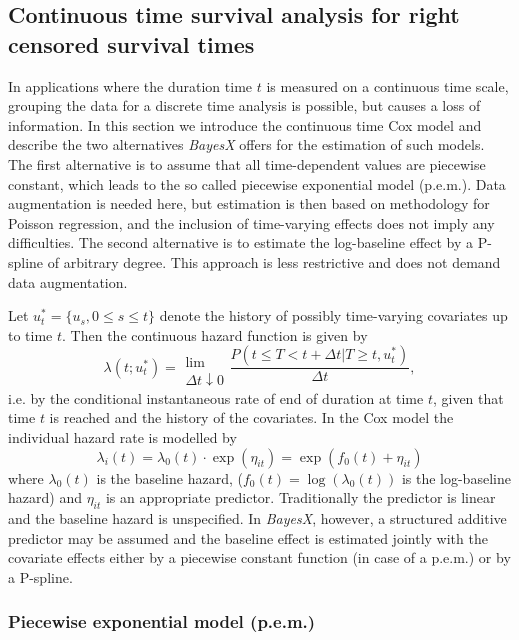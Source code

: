 \documentclass[11pt,a4paper,twoside]{bayesxarticle}
\begin{document}
\subsection{Continuous time survival analysis for right censored survival times}
\label{continuoustime}

In applications where the duration time $t$ is measured on a
continuous time scale, grouping the data for a discrete time
analysis is possible, but causes a loss of information. In this
section we introduce the continuous time Cox model and describe the
two alternatives \textit{BayesX} offers for the estimation of such
models. The first alternative is to assume that all time-dependent
values are piecewise constant, which leads to the so called
piecewise exponential model (p.e.m.). Data augmentation is needed
here, but estimation is then based on methodology for Poisson
regression, and the inclusion of time-varying effects does not imply
any difficulties. The second alternative is to estimate the
log-baseline effect by a P-spline of arbitrary degree. This approach
is less restrictive and does not demand data augmentation.

Let $u_t^{*}=\{u_s,0 \le s \le t\}$ denote the history of possibly
time-varying covariates up to time $t$. Then the continuous hazard
function is given by
\[
\lambda(t;u_t^{*})=\begin{array}{c}\\\mbox{lim}\\{\Delta t
\downarrow 0}\end{array}\frac{P(t \le T< t+\Delta t | T\ge t,
u_t^{*})}{\Delta t},
\]
i.e. by the conditional instantaneous rate of end of duration at
time $t$, given that time $t$ is reached and the history of the
covariates. In the Cox model the individual hazard rate is modelled
by
\begin{equation}\label{CoxModel}
\lambda_i(t)=\lambda_0(t)\cdot
\exp(\eta_{it})=\exp(f_0(t)+\eta_{it})
\end{equation}
where $\lambda_0(t)$ is the baseline hazard,
($f_0(t)=\log(\lambda_0(t))$ is the log-baseline hazard) and
$\eta_{it}$ is an appropriate predictor. Traditionally the predictor
is linear and the baseline hazard is unspecified. In
\textit{BayesX}, however, a structured additive predictor may be
assumed and the baseline effect is estimated jointly with the
covariate effects either by a piecewise constant function (in case
of a p.e.m.) or by a P-spline.


\subsubsection{Piecewise exponential model (p.e.m.)}
\end{document}
